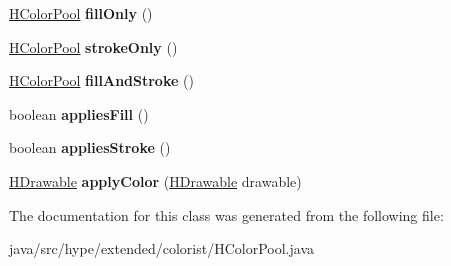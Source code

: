 \begin{DoxyCompactItemize}
\item 
\hypertarget{classhype_1_1extended_1_1colorist_1_1_h_color_pool_a99a017c993982b83e3df5c68df7be76d}{\hyperlink{classhype_1_1extended_1_1colorist_1_1_h_color_pool}{H\-Color\-Pool} {\bfseries fill\-Only} ()}\label{classhype_1_1extended_1_1colorist_1_1_h_color_pool_a99a017c993982b83e3df5c68df7be76d}

\item 
\hypertarget{classhype_1_1extended_1_1colorist_1_1_h_color_pool_ac6c12da74945bac32b46d0489676442d}{\hyperlink{classhype_1_1extended_1_1colorist_1_1_h_color_pool}{H\-Color\-Pool} {\bfseries stroke\-Only} ()}\label{classhype_1_1extended_1_1colorist_1_1_h_color_pool_ac6c12da74945bac32b46d0489676442d}

\item 
\hypertarget{classhype_1_1extended_1_1colorist_1_1_h_color_pool_afb567004caa18fd21b350b11da330346}{\hyperlink{classhype_1_1extended_1_1colorist_1_1_h_color_pool}{H\-Color\-Pool} {\bfseries fill\-And\-Stroke} ()}\label{classhype_1_1extended_1_1colorist_1_1_h_color_pool_afb567004caa18fd21b350b11da330346}

\item 
\hypertarget{classhype_1_1extended_1_1colorist_1_1_h_color_pool_a81a8947313b61d68103b463eb5e21072}{boolean {\bfseries applies\-Fill} ()}\label{classhype_1_1extended_1_1colorist_1_1_h_color_pool_a81a8947313b61d68103b463eb5e21072}

\item 
\hypertarget{classhype_1_1extended_1_1colorist_1_1_h_color_pool_a72673369644794ead89e0b134e482c08}{boolean {\bfseries applies\-Stroke} ()}\label{classhype_1_1extended_1_1colorist_1_1_h_color_pool_a72673369644794ead89e0b134e482c08}

\item 
\hypertarget{classhype_1_1extended_1_1colorist_1_1_h_color_pool_a7c7c9c7264c8f1b6d0469d94e651a559}{\hyperlink{classhype_1_1core_1_1drawable_1_1_h_drawable}{H\-Drawable} {\bfseries apply\-Color} (\hyperlink{classhype_1_1core_1_1drawable_1_1_h_drawable}{H\-Drawable} drawable)}\label{classhype_1_1extended_1_1colorist_1_1_h_color_pool_a7c7c9c7264c8f1b6d0469d94e651a559}

\end{DoxyCompactItemize}


The documentation for this class was generated from the following file\-:\begin{DoxyCompactItemize}
\item 
java/src/hype/extended/colorist/H\-Color\-Pool.\-java\end{DoxyCompactItemize}

